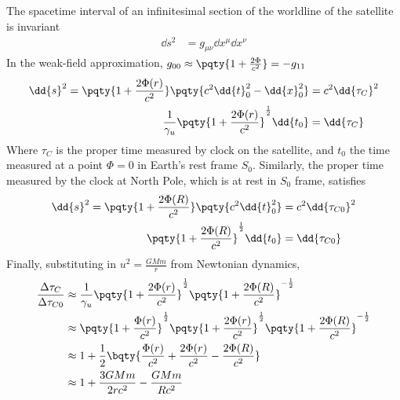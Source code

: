 \documentclass[12pt]{article}
\begin{document}
        \subsection{} The spacetime interval of an infinitesimal section of the worldline of the satellite is invariant \begin{align*}
            \dd{s}^2 &=  g_{\mu\nu} \dd{x}^\mu \dd{x}^\nu
        \end{align*}
        In the weak-field approximation, \(g_{00} \approx \pqty{1 + \frac{2\Phi}{c^2}} =- g_{11}\) \begin{align*}
            \dd{s}^2 = \pqty{1 + \frac{2\Phi(r)}{c^2}}\pqty{c^2 \dd{t}_0^2 - \dd{x}_0^2 }&= c^2 \dd{\tau_C}^2\\
            \frac{1}{\gamma_u}\pqty{1 + \frac{2\Phi(r)}{c^2}}^{\frac{1}{2}} \dd{t_0} &= \dd{\tau_C}
        \end{align*}
        Where \(\tau_C\) is the proper time measured by clock on the satellite, and \(t_0\) the time measured at a point \(\Phi = 0\) in Earth's rest frame \(S_0\). Similarly, the proper time measured by the clock at North Pole, which is at rest in \(S_0\) frame, satisfies \begin{align*}
            \dd{s}^2 = \pqty{1 + \frac{2\Phi(R)}{c^2}}\pqty{c^2 \dd{t}_0^2}&= c^2 \dd{\tau_{C 0}}^2\\
            \pqty{1 + \frac{2\Phi(R)}{c^2}}^{\frac{1}{2}} \dd{t_0} &= \dd{\tau_{C 0}}
        \end{align*}
        Finally, substituting in \( u^2 = \frac{GMm}{r}\) from Newtonian dynamics, \begin{align*}
            \frac{\Delta \tau_{C }}{\Delta \tau_{C 0}} & \approx  \frac{1}{\gamma_u}\pqty{1 + \frac{2\Phi(r)}{c^2}}^{\frac{1}{2}} \pqty{1 + \frac{2\Phi(R)}{c^2}}^{ -\frac{1}{2}} \\
            & \approx  \pqty{1 + \frac{\Phi(r)}{c^2} }^{\frac{1}{2}}\pqty{1 + \frac{2\Phi(r)}{c^2}}^{\frac{1}{2}} \pqty{1 + \frac{2\Phi(R)}{c^2}}^{ -\frac{1}{2}} \\
            & \approx  1 + \frac{1}{2}\bqty{\frac{\Phi(r)}{c^2} + \frac{2\Phi(r)}{c^2} -\frac{2\Phi(R)}{c^2}}\\
            & \approx  1 + \frac{3GMm}{2rc^2} - \frac{GMm}{Rc^2}
        \end{align*}
\end{document}
